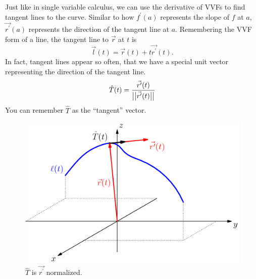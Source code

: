 \noindent
Just like in single variable calculus, we can use the derivative of VVFs to find tangent lines to the curve.
Similar to how $f^{\prime}(a)$ represents the slope of $f$ at $a$, $\vec{r^\prime}(a)$ represents the direction of the tangent line at $a$.
Remembering the VVF form of a line, the tangent line to $\vec{r}$ at $t$ is 
\begin{equation*}
	\vec{l}(t)=\vec{r}(t)+t\vec{r^\prime}(t).	
\end{equation*}
In fact, tangent lines appear so often, that we have a special unit vector representing the direction of the tangent line.
\begin{equation*}
	\hat{T}(t) = \frac{\vec{r^\prime}(t)}{\big\lvert \big\lvert \vec{r^\prime}(t) \big\rvert \big\rvert}
\end{equation*}
You can remember $\hat{T}$ as the ``tangent'' vector.

\begin{figure}[H]
	\centering
	\includegraphics[scale=0.33]{Images/vectorValuedFunctions/TangentVector}
	\caption{$\hat{T}$ is $\vec{r^\prime}$ normalized.}
\end{figure}